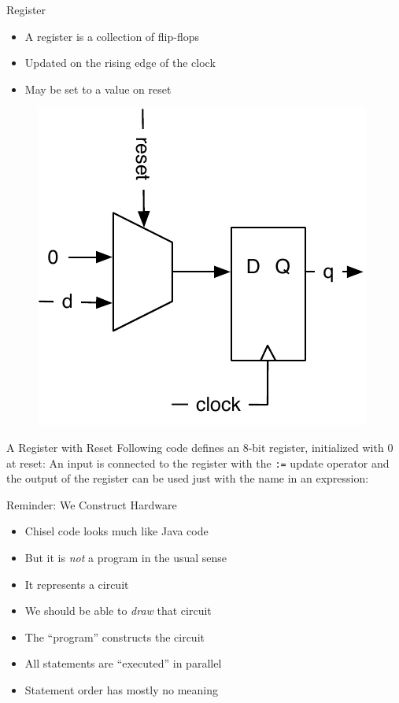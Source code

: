 \documentclass[xcolor=pdflatex,dvipsnames,table]{beamer}
\newcommand{\scale}{0.7}
\newcommand{\code}[1]{{\texttt{#1}}}
\begin{document}
\begin{frame}[fragile]{Register}
\begin{itemize}
\item A register is a collection of flip-flops
\item Updated on the rising edge of the clock
\item May be set to a value on reset
\end{itemize}
\begin{figure}
  \includegraphics[scale=\scale]{../figures/register-reset-0}
\end{figure}
\end{frame}

\begin{frame}[fragile]{A Register with Reset}
Following code defines an 8-bit register, initialized with 0 at reset:
\noindent An input is connected to the register with the \code{:=} update operator and
the output of the register can be used just with the name in an expression:
\end{frame}

\begin{frame}[fragile]{Reminder: We Construct Hardware}
\begin{itemize}
\item Chisel code looks much like Java code
\item But it is \emph{not} a program in the usual sense
\item It represents a circuit
\item We should be able to \emph{draw} that circuit
\item The ``program'' constructs the circuit
\item All statements are ``executed'' in parallel
\item Statement order has mostly no meaning
\end{itemize}
\end{frame}
\end{document}
